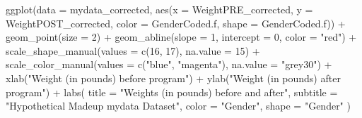 \documentclass[
  letterpaper,
  DIV=11,
  numbers=noendperiod]{scrartcl}
\newenvironment{Shaded}{\begin{snugshade}}{\end{snugshade}}
\newcommand{\AttributeTok}[1]{\textcolor[rgb]{0.40,0.45,0.13}{#1}}
\newcommand{\DecValTok}[1]{\textcolor[rgb]{0.68,0.00,0.00}{#1}}
\newcommand{\FunctionTok}[1]{\textcolor[rgb]{0.28,0.35,0.67}{#1}}
\newcommand{\NormalTok}[1]{\textcolor[rgb]{0.00,0.23,0.31}{#1}}
\newcommand{\SpecialCharTok}[1]{\textcolor[rgb]{0.37,0.37,0.37}{#1}}
\newcommand{\StringTok}[1]{\textcolor[rgb]{0.13,0.47,0.30}{#1}}
\begin{document}
\begin{Shaded}
\begin{Highlighting}[]
\FunctionTok{ggplot}\NormalTok{(}\AttributeTok{data =}\NormalTok{ mydata\_corrected,}
       \FunctionTok{aes}\NormalTok{(}\AttributeTok{x =}\NormalTok{ WeightPRE\_corrected,}
           \AttributeTok{y =}\NormalTok{ WeightPOST\_corrected,}
           \AttributeTok{color =}\NormalTok{ GenderCoded.f,}
           \AttributeTok{shape =}\NormalTok{ GenderCoded.f)) }\SpecialCharTok{+}
  \FunctionTok{geom\_point}\NormalTok{(}\AttributeTok{size =} \DecValTok{2}\NormalTok{) }\SpecialCharTok{+}
  \FunctionTok{geom\_abline}\NormalTok{(}\AttributeTok{slope =} \DecValTok{1}\NormalTok{, }
              \AttributeTok{intercept =} \DecValTok{0}\NormalTok{,}
              \AttributeTok{color =} \StringTok{"red"}\NormalTok{) }\SpecialCharTok{+}
  \FunctionTok{scale\_shape\_manual}\NormalTok{(}\AttributeTok{values =} \FunctionTok{c}\NormalTok{(}\DecValTok{16}\NormalTok{, }\DecValTok{17}\NormalTok{),}
                     \AttributeTok{na.value =} \DecValTok{15}\NormalTok{) }\SpecialCharTok{+}
  \FunctionTok{scale\_color\_manual}\NormalTok{(}\AttributeTok{values =} \FunctionTok{c}\NormalTok{(}\StringTok{"blue"}\NormalTok{, }
                                \StringTok{"magenta"}\NormalTok{),}
                     \AttributeTok{na.value =} \StringTok{"grey30"}\NormalTok{) }\SpecialCharTok{+}
  \FunctionTok{xlab}\NormalTok{(}\StringTok{"Weight (in pounds) before program"}\NormalTok{) }\SpecialCharTok{+}
  \FunctionTok{ylab}\NormalTok{(}\StringTok{"Weight (in pounds) after program"}\NormalTok{) }\SpecialCharTok{+}
  \FunctionTok{labs}\NormalTok{(}
    \AttributeTok{title =} \StringTok{"Weights (in pounds) before and after"}\NormalTok{,}
    \AttributeTok{subtitle =} \StringTok{"Hypothetical Madeup mydata Dataset"}\NormalTok{,}
    \AttributeTok{color =} \StringTok{"Gender"}\NormalTok{,}
    \AttributeTok{shape =} \StringTok{"Gender"}
\NormalTok{  ) }
\end{Highlighting}
\end{Shaded}
\end{document}
